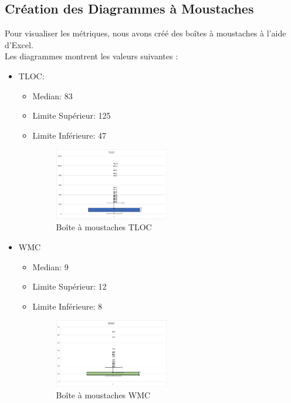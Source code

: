 \documentclass{proc}
\begin{document}
\subsection{Création des Diagrammes à Moustaches}
Pour visualiser les métriques, nous avons créé des boîtes à moustaches à l'aide d'Excel. \\Les diagrammes montrent les valeurs suivantes :
\\
\begin{itemize}
\item{TLOC: }
\begin{itemize}
    \item Median: 83
    \item Limite Supérieur: 125
    \item Limite Inférieure: 47
    \begin{figure}[H]
    \centering
    \includegraphics[width=0.5\textwidth]{images/TLOC.png}
    \caption{Boîte à moustaches TLOC}
    \label{fig:TLOC.png}
    \end{figure}
\end{itemize}
\vspace{8px}

\item{WMC}
\begin{itemize}
    \item Median: 9
    \item Limite Supérieur: 12
    \item Limite Inférieure: 8
    \begin{figure}[H]
    \centering
    \includegraphics[width=0.5\textwidth]{images/WMC.png}
    \caption{Boîte à moustaches WMC}
    \label{fig:WMC.png}
    \end{figure}
\end{itemize}


\end{itemize}
\end{document}
